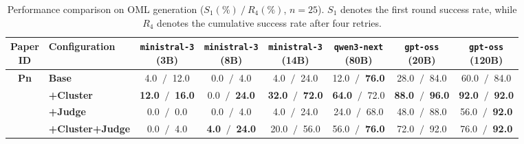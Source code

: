 \begin{table}[htbp]
    \centering
    \small
    \setlength{\tabcolsep}{4pt}
    \caption{Performance comparison on OML generation ($S_1(\%)~/~R_4(\%)$, $n=25$). $S_1$ denotes the first round success rate, while $R_4$ denotes the cumulative success rate after four retries.}
    \begin{tabular}{c|l|cccccc}
        \hline
        \makecell{\textbf{Paper} \\ \textbf{ID}} & \textbf{Configuration} & \makecell{\texttt{ministral-3} \\ (3B)} & \makecell{\texttt{ministral-3} \\ (8B)} & \makecell{\texttt{ministral-3} \\ (14B)} & \makecell{\texttt{qwen3-next} \\ (80B)} & \makecell{\texttt{gpt-oss} \\ (20B)} & \makecell{\texttt{gpt-oss} \\ (120B)} \\
        \hline
        
        \multirow{4}{*}{\textbf{Pn}} 
          & \textbf{Base}& 4.0 $~/~$ 12.0 & 0.0 $~/~$ 4.0 & 4.0 $~/~$ 24.0 & 12.0 $~/~$ \textbf{76.0} & 28.0 $~/~$ 84.0 & 60.0 $~/~$ 84.0 \\
          & \textbf{+Cluster}& \textbf{12.0} $~/~$ \textbf{16.0} & 0.0 $~/~$ \textbf{24.0} & \textbf{32.0} $~/~$ \textbf{72.0} & \textbf{64.0} $~/~$ 72.0 & \textbf{88.0} $~/~$ \textbf{96.0} & \textbf{92.0} $~/~$ \textbf{92.0} \\
          & \textbf{+Judge}& 0.0 $~/~$ 0.0 & 0.0 $~/~$ 4.0 & 4.0 $~/~$ 24.0 & 24.0 $~/~$ 68.0 & 48.0 $~/~$ 88.0 & 56.0 $~/~$ \textbf{92.0} \\
          & \textbf{+Cluster+Judge}& 0.0 $~/~$ 4.0 & \textbf{4.0} $~/~$ \textbf{24.0} & 20.0 $~/~$ 56.0 & 56.0 $~/~$ \textbf{76.0} & 72.0 $~/~$ 92.0 & 76.0 $~/~$ \textbf{92.0} \\
        \hline
        
    \end{tabular}
    \label{tab:success_rates_pn}
\end{table}